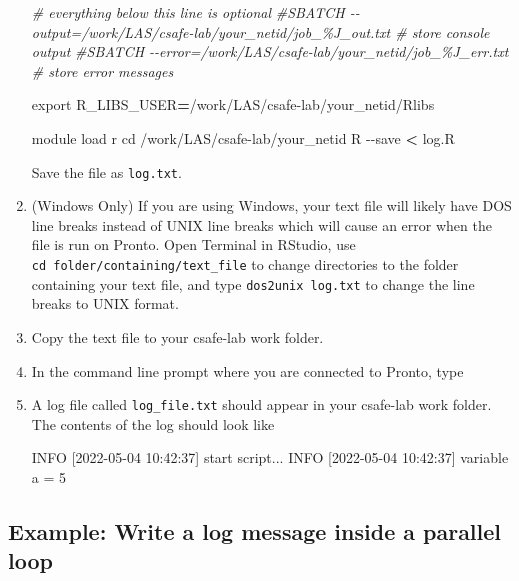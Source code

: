 \documentclass[
]{book}
\newenvironment{Shaded}{\begin{snugshade}}{\end{snugshade}}
\newcommand{\AttributeTok}[1]{\textcolor[rgb]{0.77,0.63,0.00}{#1}}
\newcommand{\BuiltInTok}[1]{#1}
\newcommand{\CommentTok}[1]{\textcolor[rgb]{0.56,0.35,0.01}{\textit{#1}}}
\newcommand{\ExtensionTok}[1]{#1}
\newcommand{\NormalTok}[1]{#1}
\newcommand{\OperatorTok}[1]{\textcolor[rgb]{0.81,0.36,0.00}{\textbf{#1}}}
\newcommand{\VariableTok}[1]{\textcolor[rgb]{0.00,0.00,0.00}{#1}}
\begin{document}
\begin{enumerate}
\begin{Shaded}
\begin{Highlighting}[]
\CommentTok{\# everything below this line is optional}
\CommentTok{\#SBATCH {-}{-}output=/work/LAS/csafe{-}lab/your\_netid/job\_\%J\_out.txt \# store console output}
\CommentTok{\#SBATCH {-}{-}error=/work/LAS/csafe{-}lab/your\_netid/job\_\%J\_err.txt \# store error messages}

\BuiltInTok{export} \VariableTok{R\_LIBS\_USER}\OperatorTok{=}\NormalTok{/work/LAS/csafe{-}lab/your\_netid/Rlibs}

\ExtensionTok{module}\NormalTok{ load r}
\BuiltInTok{cd}\NormalTok{ /work/LAS/csafe{-}lab/your\_netid}
\ExtensionTok{R} \AttributeTok{{-}{-}save} \OperatorTok{\textless{}}\NormalTok{ log.R}
\end{Highlighting}
\end{Shaded}

  Save the file as \texttt{log.txt}.
\item
  (Windows Only) If you are using Windows, your text file will likely have DOS line breaks instead of UNIX line breaks which will cause an error when the file is run on Pronto. Open Terminal in RStudio, use \texttt{cd\ folder/containing/text\_file} to change directories to the folder containing your text file, and type \texttt{dos2unix\ log.txt} to change the line breaks to UNIX format.
\item
  Copy the text file to your csafe-lab work folder.
\item
  In the command line prompt where you are connected to Pronto, type

\begin{Shaded}
\end{Shaded}
\item
  A log file called \texttt{log\_file.txt} should appear in your csafe-lab work folder. The contents of the log should look like

\begin{Shaded}
\begin{Highlighting}[]
\ExtensionTok{INFO}\NormalTok{ [2022{-}05{-}04 10:42:37] start script...}
\ExtensionTok{INFO}\NormalTok{ [2022{-}05{-}04 10:42:37] variable a = 5}
\end{Highlighting}
\end{Shaded}
\end{enumerate}

\hypertarget{example-write-a-log-message-inside-a-parallel-loop}{%
\subsection{Example: Write a log message inside a parallel loop}\label{example-write-a-log-message-inside-a-parallel-loop}}
\end{document}
